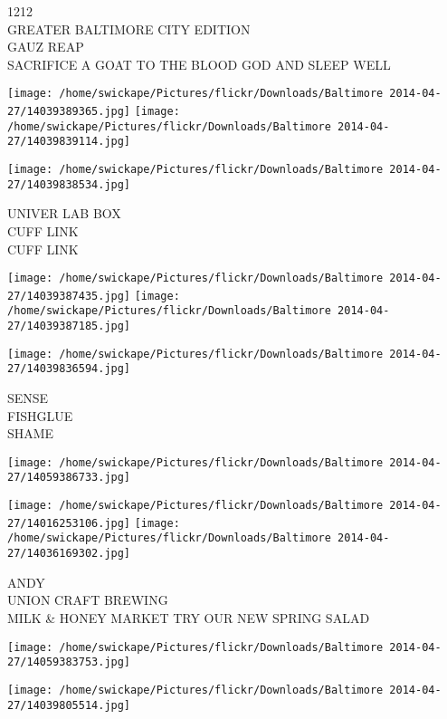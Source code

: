\documentclass[10pt,letterpaper]{article}
\begin{document}
1212\\
GREATER BALTIMORE CITY EDITION\\
GAUZ REAP\\
SACRIFICE A GOAT TO THE BLOOD GOD AND SLEEP WELL\\
\pagebreak

\texttt{[image: /home/swickape/Pictures/flickr/Downloads/Baltimore 2014-04-27/14039389365.jpg]}
\texttt{[image: /home/swickape/Pictures/flickr/Downloads/Baltimore 2014-04-27/14039839114.jpg]}

\vspace{0.25in}
\texttt{[image: /home/swickape/Pictures/flickr/Downloads/Baltimore 2014-04-27/14039838534.jpg]}

UNIVER LAB BOX\\
CUFF LINK\\
CUFF LINK\\
\pagebreak

\texttt{[image: /home/swickape/Pictures/flickr/Downloads/Baltimore 2014-04-27/14039387435.jpg]}
\texttt{[image: /home/swickape/Pictures/flickr/Downloads/Baltimore 2014-04-27/14039387185.jpg]}

\texttt{[image: /home/swickape/Pictures/flickr/Downloads/Baltimore 2014-04-27/14039836594.jpg]}

SENSE\\
FISHGLUE\\
SHAME\\
\pagebreak

\texttt{[image: /home/swickape/Pictures/flickr/Downloads/Baltimore 2014-04-27/14059386733.jpg]}

\vspace{0.25in}
\texttt{[image: /home/swickape/Pictures/flickr/Downloads/Baltimore 2014-04-27/14016253106.jpg]}
\texttt{[image: /home/swickape/Pictures/flickr/Downloads/Baltimore 2014-04-27/14036169302.jpg]}

ANDY\\
UNION CRAFT BREWING\\
MILK \& HONEY MARKET TRY OUR NEW SPRING SALAD\\
\pagebreak

\texttt{[image: /home/swickape/Pictures/flickr/Downloads/Baltimore 2014-04-27/14059383753.jpg]}

\vspace{0.25in}
\texttt{[image: /home/swickape/Pictures/flickr/Downloads/Baltimore 2014-04-27/14039805514.jpg]}
\end{document}
